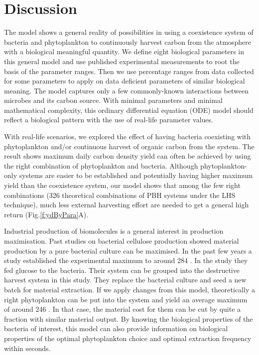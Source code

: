 \documentclass[../thesis.tex]{subfiles} %
\begin{document}
\section{Discussion}
The model shows a general reality of possibilities in using a coexistence system of bacteria and phytoplankton to continuously harvest carbon from the atmosphere with a biological meaningful quantity.  We define eight biological parameters in this general model and use published experimental measurements to root the basis of the parameter ranges.  Then we use percentage ranges from data collected for some parameters to apply on data deficient parameters of similar biological meaning.  The model captures only a few commonly-known interactions between microbes and its carbon source.  With minimal parameters and minimal mathematical complexity, this ordinary differential equation (ODE) model should reflect a biological pattern with the use of real-life parameter values.

With real-life scenarios, we explored the effect of having bacteria coexisting with phytoplankton and/or continuous harvest of organic carbon from the system.  The result shows maximum daily carbon density yield can often be achieved by using the right combination of phytoplankton and bacteria.  Although phytoplankton-only systems are easier to be established and potentially having higher maximum yield than the coexistence system, our model shows that among the few right combinations (326 theoretical combinations of PBH systems under the LHS technique), much less external harvesting effort are needed to get a general high return (Fig.\ref{f:ydByPara}A).

Industrial production of biomolecules is a general interest in production maximisation.  Past studies on bacterial cellulose production showed material production by a pure bacterial culture can be maximised.  In the past few years a study established the experimental maximum to around 284 \dxdt\autocite{aytekin2016statistical}.  In the study they fed glucose to the bacteria.  Their system can be grouped into the destructive harvest system in this study.  They replace the bacterial culture and seed a new batch for material extraction.  If we apply changes from this model, theoretically a right phytoplankton can be put into the system and yield an average maximum of around 246 \dxdt.  In that case, the material cost for them can be cut by quite a fraction with similar material output.  By knowing the biological properties of the bacteria of interest, this model can also provide information on biological properties of the optimal phytoplankton choice and optimal extraction frequency within seconds.
\end{document}
